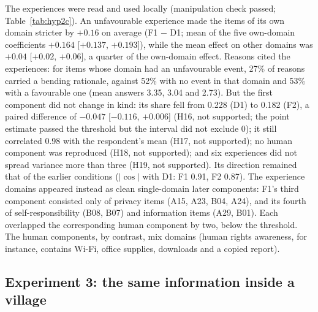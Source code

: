 \documentclass[11pt]{article}
\begin{document}
The experiences were read and used locally (manipulation check passed; Table~\ref{tab:hyp2c}). An unfavourable experience made the items of its own domain stricter by $+0.16$ on average (F1 $-$ D1; mean of the five own-domain coefficients $+0.164$ [$+0.137$, $+0.193$]), while the mean effect on other domains was $+0.04$ [$+0.02$, $+0.06$], a quarter of the own-domain effect. Reasons cited the experiences: for items whose domain had an unfavourable event, 27\% of reasons carried a bending rationale, against 52\% with no event in that domain and 53\% with a favourable one (mean answers 3.35, 3.04 and 2.73). But the first component did not change in kind: its share fell from 0.228 (D1) to 0.182 (F2), a paired difference of $-0.047$ [$-0.116$, $+0.006$] (H16, not supported; the point estimate passed the threshold but the interval did not exclude 0); it still correlated 0.98 with the respondent's mean (H17, not supported); no human component was reproduced (H18, not supported); and six experiences did not spread variance more than three (H19, not supported). Its direction remained that of the earlier conditions ($|\cos|$ with D1: F1 0.91, F2 0.87). The experience domains appeared instead as clean single-domain later components: F1's third component consisted only of privacy items (A15, A23, B04, A24), and its fourth of self-responsibility (B08, B07) and information items (A29, B01). Each overlapped the corresponding human component by two, below the threshold. The human components, by contrast, mix domains (human rights awareness, for instance, contains Wi-Fi, office supplies, downloads and a copied report).

\subsection{Experiment 3: the same information inside a village}
\end{document}
